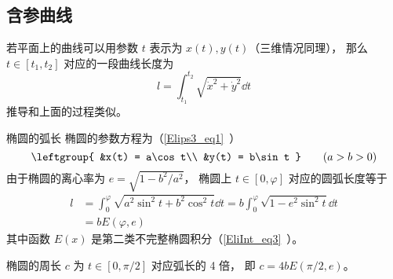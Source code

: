 \subsection{含参曲线}
若平面上的曲线可以用参数 $t$ 表示为 $x(t), y(t)$（三维情况同理）， 那么 $t \in [t_1, t_2]$ 对应的一段曲线长度为
\begin{equation}\label{CurLen_eq2}
l = \int_{t_1}^{t_2} \sqrt{\dot x^2 + \dot y^2} \dd{t}
\end{equation}
推导和上面的过程类似。

\begin{example}{椭圆的弧长}\label{CurLen_ex1}
椭圆的参数方程为（\autoref{Elips3_eq1}~）
\begin{equation}
\leftgroup{
&x(t) = a\cos t\\
&y(t) = b\sin t
} \qquad
(a > b > 0)
\end{equation}
由于椭圆的离心率为 $e = \sqrt{1 - b^2/a^2}$， 椭圆上 $t \in [0, \varphi]$ 对应的圆弧长度等于
\begin{equation}
\begin{aligned}
l &= \int_0^{\varphi} \sqrt{a^2\sin^2 t + b^2 \cos^2 t} \dd{t}
= b\int_0^\varphi \sqrt{1 - e^2\sin^2 t} \dd{t}\\
&= b E(\varphi, e)
\end{aligned}
\end{equation}
其中函数 $E(x)$ 是第二类不完整椭圆积分（\autoref{EliInt_eq3}~）。

椭圆的周长 $c$ 为 $t \in [0, \pi/2]$ 对应弧长的 4 倍， 即 $c = 4bE(\pi/2, e)$。
\end{example}
